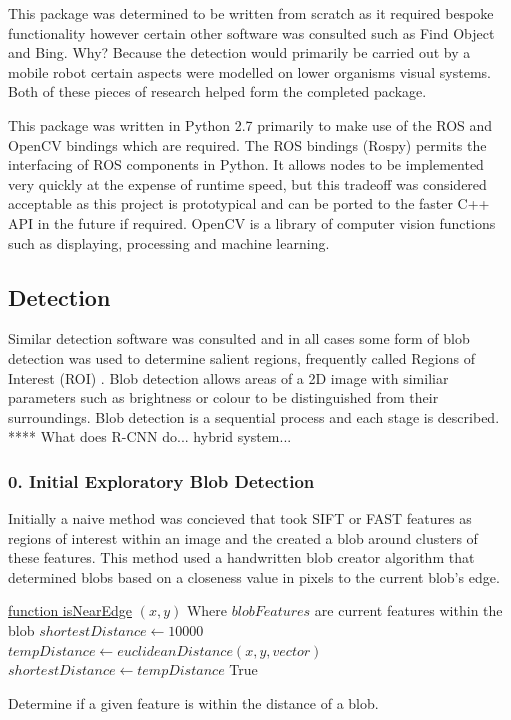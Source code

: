 \documentclass{mproj}
\begin{document}
This package was determined to be written from scratch as it required bespoke functionality however certain other software was consulted such as Find Object \cite{} and Bing\cite{}. Why? Because the detection would primarily be carried out by a mobile robot certain aspects were modelled on lower organisms visual systems. Both of these pieces of research helped form the completed package.

This package was written in Python 2.7 primarily to make use of the ROS and OpenCV bindings which are required. The ROS bindings (Rospy) permits the interfacing of ROS components in Python. It allows nodes to be implemented very quickly at the expense of runtime speed, but this tradeoff was considered acceptable as this project is prototypical and can be ported to the faster C++ API in the future if required. OpenCV is a library of computer vision functions such as displaying, processing and machine learning.


\subsection{Detection}

Similar detection software was consulted and in all cases some form of blob detection was used to determine salient regions, frequently called Regions of Interest (ROI) \cite{HosangBS14}. Blob detection allows areas of a 2D image with similiar parameters such as brightness or colour to be distinguished from their surroundings. Blob detection is a sequential process and each stage is described.  **** What does R-CNN do... hybrid system...

\subsubsection{0. Initial Exploratory Blob Detection}

Initially a naive method was concieved that took SIFT or FAST features as regions of interest within an image and the created a blob around clusters of these features. This method used a handwritten blob creator algorithm that determined blobs based on a closeness value in pixels to the current blob's edge.

 \begin{algorithm}

    \underline{function isNearEdge} $(x,y)$\;
    Where $blobFeatures$ are current features within the blob\;
    $shortestDistance \leftarrow 10000 $\;
    {
    $tempDistance \leftarrow euclideanDistance( x,y,vector ) $\;
    {
    	$shortestDistance \leftarrow tempDistance$
    }
    }
    { 
    	\Return True
    }

    
    \caption{Determine if a given feature is within the distance of a blob.  }
\end{algorithm}
\end{document}
